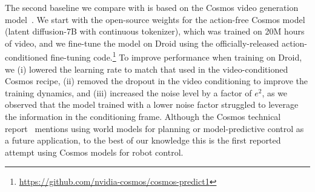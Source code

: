 \documentclass[]{fairmeta}
\begin{document}
The second baseline we compare with is based on the Cosmos video generation model~\citep{agarwal2025cosmos}. 
We start with the open-source weights for the action-free Cosmos model (latent diffusion-7B with continuous tokenizer), which was trained on 20M hours of video, and we fine-tune the model on Droid using the officially-released action-conditioned fine-tuning code.\footnote{\url{https://github.com/nvidia-cosmos/cosmos-predict1}}
To improve performance when training on Droid, we (i) lowered the learning rate to match that used in the video-conditioned Cosmos recipe, (ii) removed the dropout in the video conditioning to improve the training dynamics, and (iii) increased the noise level by a factor of $e^2$, as we observed that the model trained with a lower noise factor struggled to leverage the information in the conditioning frame. Although the Cosmos technical report~\citep{agarwal2025cosmos} mentions using world models for planning or model-predictive control as a future application, to the best of our knowledge this is the first reported attempt using Cosmos models for robot control.
\end{document}
